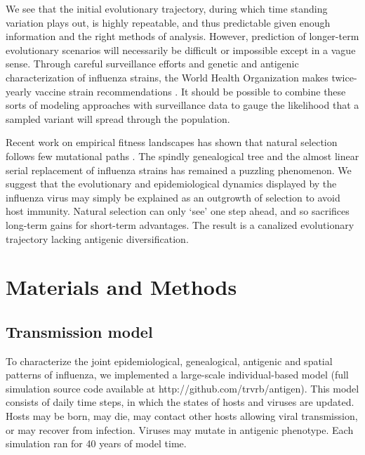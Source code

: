 \documentclass[11pt,oneside,letterpaper]{article}
\begin{document}
We see that the initial evolutionary trajectory, during which time standing variation plays out, is highly repeatable, and thus predictable given enough information and the right methods of analysis.  However, prediction of longer-term evolutionary scenarios will necessarily be difficult or impossible except in a vague sense.  Through careful surveillance efforts and genetic and antigenic characterization of influenza strains, the World Health Organization makes twice-yearly vaccine strain recommendations \cite{Barr10}.  It should be possible to combine these sorts of modeling approaches with surveillance data to gauge the likelihood that a sampled variant will spread through the population.

Recent work on empirical fitness landscapes has shown that natural selection follows few mutational paths \cite{Weinreich06}.  The spindly genealogical tree and the almost linear serial replacement of influenza strains has remained a puzzling phenomenon.  We suggest that the evolutionary and epidemiological dynamics displayed by the influenza virus may simply be explained as an outgrowth of selection to avoid host immunity.  Natural selection can only `see' one step ahead, and so sacrifices long-term gains for short-term advantages.  The result is a canalized evolutionary trajectory lacking antigenic diversification.

\section*{Materials and Methods}

\subsection*{Transmission model}

To characterize the joint epidemiological, genealogical, antigenic and spatial patterns of influenza, we implemented a large-scale individual-based model (full simulation source code available at http://github.com/trvrb/antigen).  This model consists of daily time steps, in which the states of hosts and viruses are updated.  Hosts may be born, may die, may contact other hosts allowing viral transmission, or may recover from infection.  Viruses may mutate in antigenic phenotype.  Each simulation ran for 40 years of model time.  
\end{document}
